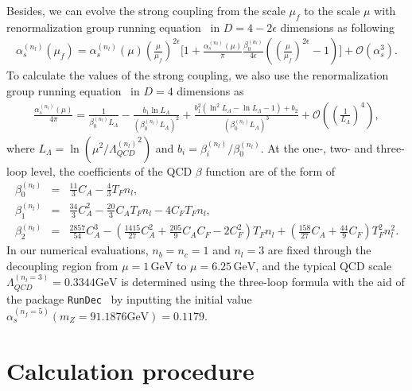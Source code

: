 \documentclass[onecolumn,preprintnumbers,aps,superscriptaddress,nofootinbib,prd,notitlepage]{revtex4-1}
\newcommand{\beq}{\begin{eqnarray}}
\newcommand{\eeq}{\end{eqnarray}}
\newcommand{\non}{\nonumber\\ }
\begin{document}
{Besides, we  can evolve the strong coupling from the scale $\mu_f$ to the scale $\mu$ with  renormalization group running equation~\cite{Abreu:2022cco} in $D=4-2 \epsilon$ dimensions  as following
\begin{align}\label{asrun1}
\alpha_s^{(n_l)}\left(\mu_f\right)=
\alpha_s^{(n_l)}\left(\mu\right)\left(\frac{\mu}{\mu_f}\right)^{2\epsilon}
\bigg[1+\frac{\alpha_s^{(n_l)}\left(\mu\right)}{\pi}\frac{\beta_0^{(n_l)}}{4\epsilon}\left(\left(\frac{\mu}{\mu_f}\right)^{2\epsilon}-1\right)\bigg] + \mathcal{O}{(\alpha_s^3)}.
\end{align}
To calculate the values of the strong coupling,  we  also use the renormalization group running equation~\cite{Chetyrkin:2000yt} in $D=4$ dimensions as
\begin{align}\label{asrun2}
\frac{\alpha_s^{(n_l)}\left(\mu\right)}{4\pi}=
\frac{1}{\beta_0^{(n_l)}L_{\Lambda}}-\frac{b_1 \ln L_{\Lambda}}{\left(\beta_0^{(n_l)}L_{\Lambda}\right)^2}+\frac{b_1^2(\ln^2 L_{\Lambda}-\ln L_{\Lambda}-1)+b_2}{\left(\beta_0^{(n_l)}L_{\Lambda}\right)^3}+\mathcal{O}{\left(\left(\frac{1}{L_{\Lambda}}\right)^4\right)},
\end{align}
where $L_{\Lambda}=\ln\left(\mu^2/{\Lambda_{QCD}^{(n_l)}}^2\right)$ and $b_i=\beta_i^{(n_l)}/{\beta_0^{(n_l)}}$.
At the  one-, two- and three-loop level, the coefficients of the QCD $\beta$ function  are of the form of
\beq
 \beta_0^{(n_l)} &=& \frac{11}{3} C_A- \frac{4}{3} T_F n_l, \non
 \beta_1^{(n_l)} &=& \frac{34}{3} C_A^2- \frac{20}{3} C_A T_F n_l - 4 C_F T_F n_l,  \non
 \beta_2^{(n_l)} &=& \frac{2857}{54} C_A^3- \left ( \frac{1415}{27} C_A^2+\frac{205}{9} C_A C_F-2C_F^2\right ) T_F n_l+ \left ( \frac{158}{27} C_A+\frac{44}{9}  C_F \right ) T_F^2 n_l^2.
\eeq
In our numerical evaluations,  $n_b=n_c=1$ and $n_l=3$ are fixed through the decoupling region from $\mu=1\,\mathrm{GeV}$ to $\mu=6.25\,\mathrm{GeV}$,
and the typical QCD scale $\Lambda_{QCD}^{(n_l=3)}=0.3344\mathrm{GeV}$  is  determined using the three-loop formula with the aid of the package {\texttt{RunDec}}~\cite{Chetyrkin:2000yt,Schmidt:2012az,Deur:2016tte,Herren:2017osy}  by inputting the initial value $\alpha_s^{(n_f=5)}\left(m_Z=91.1876\mathrm{GeV}\right)=0.1179$.





\section{Calculation procedure~\label{Calculationprocedure}}

}
\end{document}

